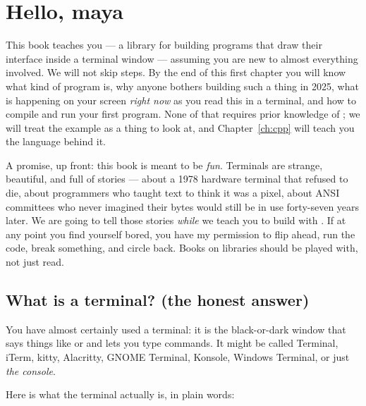\chapter{Hello, maya}
\label{ch:intro}

This book teaches you \maya{} --- a library for building programs that
draw their interface inside a terminal window --- assuming you are new
to almost everything involved. We will not skip steps. By the end of
this first chapter you will know what kind of program \maya{} is, why
anyone bothers building such a thing in 2025, what is happening on
your screen \emph{right now} as you read this in a terminal, and how
to compile and run your first \maya{} program. None of that requires
prior knowledge of \cpp{}; we will treat the example as a thing to
look at, and Chapter~\ref{ch:cpp} will teach you the language behind
it.

\begin{aside}
A promise, up front: this book is meant to be \emph{fun}. Terminals
are strange, beautiful, and full of stories --- about a 1978 hardware
terminal that refused to die, about programmers who taught text to
think it was a pixel, about ANSI committees who never imagined their
bytes would still be in use forty-seven years later. We are going to
tell those stories \emph{while} we teach you to build with \maya{}.
If at any point you find yourself bored, you have my permission to
flip ahead, run the code, break something, and circle back. Books on
libraries should be played with, not just read.
\end{aside}


\section{What is a terminal? (the honest answer)}

You have almost certainly used a terminal: it is the black-or-dark
window that says things like \code{\$} or \code{>} and lets you type
commands. It might be called Terminal, iTerm, kitty, Alacritty, GNOME
Terminal, Konsole, Windows Terminal, or just \emph{the console}.

Here is what the terminal actually is, in plain words:

